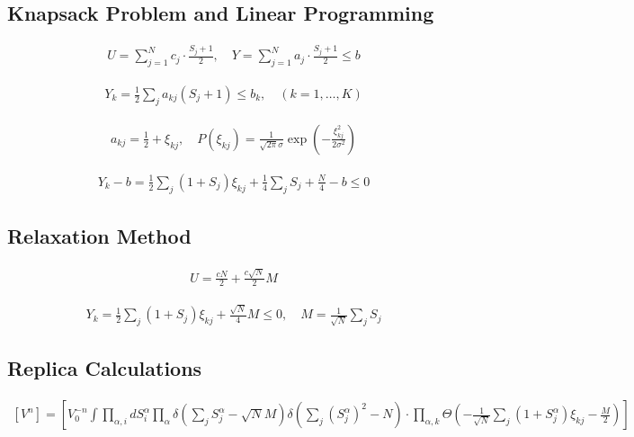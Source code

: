 \documentclass{article}
\begin{document}
\subsection{Knapsack Problem and Linear Programming}

\begin{align*}
U = \sum_{j=1}^{N} c_j \cdot \frac{S_j + 1}{2}, \quad Y = \sum_{j=1}^{N} a_j \cdot \frac{S_j + 1}{2} \leq b \tag{9.25}
\end{align*}

\begin{align*}
Y_k = \frac{1}{2} \sum_{j} a_{kj} \left( S_j + 1 \right) \leq b_k, \quad (k=1, \ldots, K) \tag{9.26}
\end{align*}

\begin{align*}
a_{kj} = \frac{1}{2} + \xi_{kj}, \quad P(\xi_{kj}) = \frac{1}{\sqrt{2\pi} \sigma} \exp \left( -\frac{\xi_{kj}^2}{2 \sigma^2} \right) \tag{9.27}
\end{align*}

\begin{align*}
Y_k - b = \frac{1}{2} \sum_j (1 + S_j) \xi_{kj} + \frac{1}{4} \sum_j S_j + \frac{N}{4} - b \leq 0 \tag{9.28}
\end{align*}

\subsection{Relaxation Method}

\begin{align*}
U = \frac{c N}{2} + \frac{c \sqrt{N}}{2} M \tag{9.29}
\end{align*}

\begin{align*}
Y_k = \frac{1}{2} \sum_j (1 + S_j) \xi_{kj} + \frac{\sqrt{N}}{4} M \leq 0, \quad M = \frac{1}{\sqrt{N}} \sum_j S_j \tag{9.30}
\end{align*}

\subsection{Replica Calculations}

\begin{align*}
\left[ V^n \right] = \left[ V_0^{-n} \int \prod_{\alpha, i} d S_i^\alpha \prod_{\alpha} \delta\left( \sum_j S_j^\alpha - \sqrt{N} M \right) \delta\left( \sum_j \left( S_j^\alpha \right)^2 - N \right) \cdot \prod_{\alpha, k} \Theta \left( -\frac{1}{\sqrt{N}} \sum_j (1 + S_j^\alpha) \xi_{kj} - \frac{M}{2} \right) \right] \tag{9.31}
\end{align*}
\end{document}
